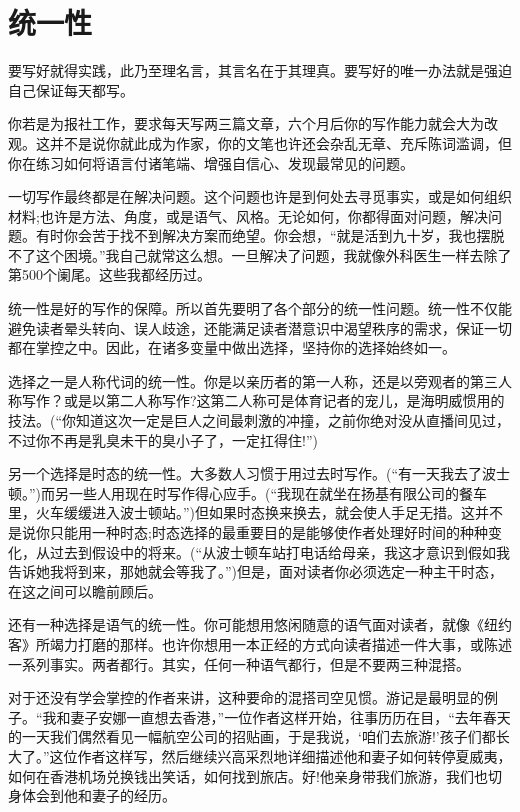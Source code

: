 \chapter{统一性}
要写好就得实践，此乃至理名言，其言名在于其理真。要写好的唯一办法就是强迫自己保证每天都写。

你若是为报社工作，要求每天写两三篇文章，六个月后你的写作能力就会大为改观。这并不是说你就此成为作家，你的文笔也许还会杂乱无章、充斥陈词滥调，但你在练习如何将语言付诸笔端、增强自信心、发现最常见的问题。

一切写作最终都是在解决问题。这个问题也许是到何处去寻觅事实，或是如何组织材料;也许是方法、角度，或是语气、风格。无论如何，你都得面对问题，解决问题。有时你会苦于找不到解决方案而绝望。你会想，“就是活到九十岁，我也摆脱不了这个困境。”我自己就常这么想。一旦解决了问题，我就像外科医生一样去除了第500个阑尾。这些我都经历过。

统一性是好的写作的保障。所以首先要明了各个部分的统一性问题。统一性不仅能避免读者晕头转向、误人歧途，还能满足读者潜意识中渴望秩序的需求，保证一切都在掌控之中。因此，在诸多变量中做出选择，坚持你的选择始终如一。

选择之一是人称代词的统一性。你是以亲历者的第一人称，还是以旁观者的第三人称写作？或是以第二人称写作?这第二人称可是体育记者的宠儿，是海明威惯用的技法。(“你知道这次一定是巨人之间最刺激的冲撞，之前你绝对没从直播间见过，不过你不再是乳臭未干的臭小子了，一定扛得住!”)

另一个选择是时态的统一性。大多数人习惯于用过去时写作。(“有一天我去了波士顿。”)而另一些人用现在时写作得心应手。(“我现在就坐在扬基有限公司的餐车里，火车缓缓进入波士顿站。”)但如果时态换来换去，就会使人手足无措。这并不是说你只能用一种时态;时态选择的最重要目的是能够使作者处理好时间的种种变化，从过去到假设中的将来。(“从波士顿车站打电话给母亲，我这才意识到假如我告诉她我将到来，那她就会等我了。”)但是，面对读者你必须选定一种主干时态，在这之间可以瞻前顾后。

还有一种选择是语气的统一性。你可能想用悠闲随意的语气面对读者，就像《纽约客》所竭力打磨的那样。也许你想用一本正经的方式向读者描述一件大事，或陈述一系列事实。两者都行。其实，任何一种语气都行，但是不要两三种混搭。

对于还没有学会掌控的作者来讲，这种要命的混搭司空见惯。游记是最明显的例子。“我和妻子安娜一直想去香港，”一位作者这样开始，往事历历在目，“去年春天的一天我们偶然看见一幅航空公司的招贴画，于是我说，‘咱们去旅游!’孩子们都长大了。”这位作者这样写，然后继续兴高采烈地详细描述他和妻子如何转停夏威夷，如何在香港机场兑换钱出笑话，如何找到旅店。好!他亲身带我们旅游，我们也切身体会到他和妻子的经历。

